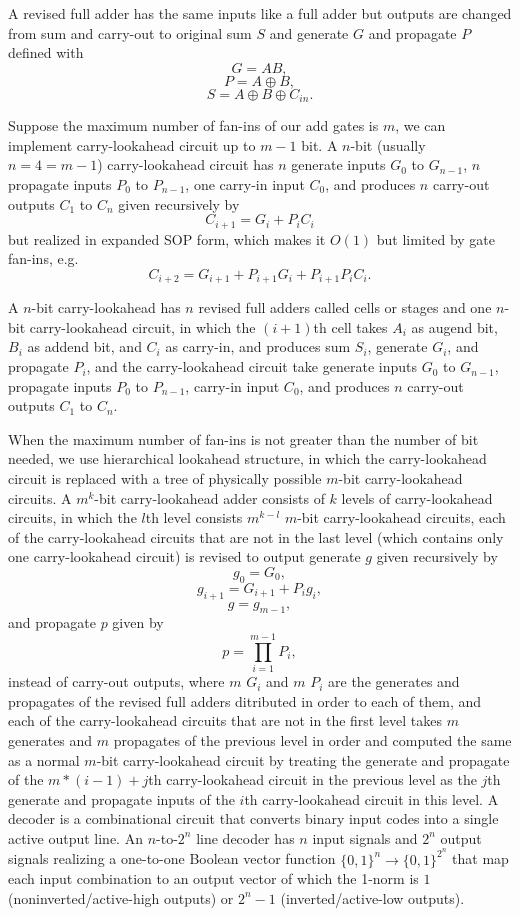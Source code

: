 \documentclass[a4paper,12pt]{article}
\begin{document}
\begin{itemize}
\begin{itemize}
\begin{itemize}
\begin{itemize}
\begin{itemize}
\begin{itemize}
\begin{itemize}
A revised full adder has the same inputs like a full adder but outputs are changed from sum and carry-out to original sum $S$ and generate $G$ and propagate $P$ defined with
\[G=AB,\]
\[P=A\oplus B,\]
\[S=A\oplus B\oplus C_{in}.\]

Suppose the maximum number of fan-ins of our add gates is $m$, we can implement carry-lookahead circuit up to $m-1$ bit. A $n$-bit (usually $n=4=m-1$) carry-lookahead circuit has $n$ generate inputs $G_0$ to $G_{n-1}$, $n$ propagate inputs $P_0$ to $P_{n-1}$, one carry-in input $C_0$, and produces $n$ carry-out outputs $C_1$ to $C_n$ given recursively by
\[C_{i+1}=G_i+P_iC_i\]
but realized in expanded SOP form, which makes it $O(1)$ but limited by gate fan-ins, e.g.
\[C_{i+2}=G_{i+1}+P_{i+1}G_i+P_{i+1}P_iC_i.\]

A $n$-bit carry-lookahead has $n$ revised full adders called cells or stages and one $n$-bit carry-lookahead circuit, in which the $(i+1)$th cell takes $A_i$ as augend bit, $B_i$ as addend bit, and $C_i$ as carry-in, and produces sum $S_i$, generate $G_i$, and propagate $P_i$, and the carry-lookahead circuit take generate inputs $G_0$ to $G_{n-1}$, propagate inputs $P_0$ to $P_{n-1}$, carry-in input $C_0$, and produces $n$ carry-out outputs $C_1$ to $C_n$.

When the maximum number of fan-ins is not greater than the number of bit needed, we use hierarchical lookahead structure, in which the carry-lookahead circuit is replaced with a tree of physically possible $m$-bit carry-lookahead circuits. A $m^k$-bit carry-lookahead adder consists of $k$ levels of carry-lookahead circuits, in which the $l$th level consists $m^{k-l}$ $m$-bit carry-lookahead circuits, each of the carry-lookahead circuits that are not in the last level (which contains only one
carry-lookahead circuit) is revised to output generate $g$ given recursively by
\[g_0=G_0,\]
\[g_{i+1}=G_{i+1}+P_ig_i,\]
\[g=g_{m-1},\]
and propagate $p$ given by
\[p=\prod_{i=1}^{m-1}P_i,\]
instead of carry-out outputs, where $m$ $G_i$ and $m$ $P_i$ are the generates and propagates of the revised full adders ditributed in order to each of them, and each of the carry-lookahead circuits that are not in the first level takes $m$ generates and $m$ propagates of the previous level in order and computed the same as a normal $m$-bit carry-lookahead circuit by treating the generate and propagate of the $m*(i-1)+j$th carry-lookahead circuit in the previous level as the $j$th generate and propagate inputs of the $i$th carry-lookahead circuit in this level.
A decoder is a combinational circuit that converts binary input codes into a single active output line. An $n$-to-$2^n$ line decoder has $n$ input signals and $2^n$ output signals realizing a one-to-one Boolean vector function $\{0,1\}^n\to\{0,1\}^{2^n}$ that map each input combination to an output vector of which the 1-norm is $1$ (noninverted/active-high outputs) or $2^n-1$ (inverted/active-low outputs).


\end{itemize}
\end{itemize}
\end{itemize}
\end{itemize}
\end{itemize}
\end{itemize}
\end{itemize}
\end{document}
